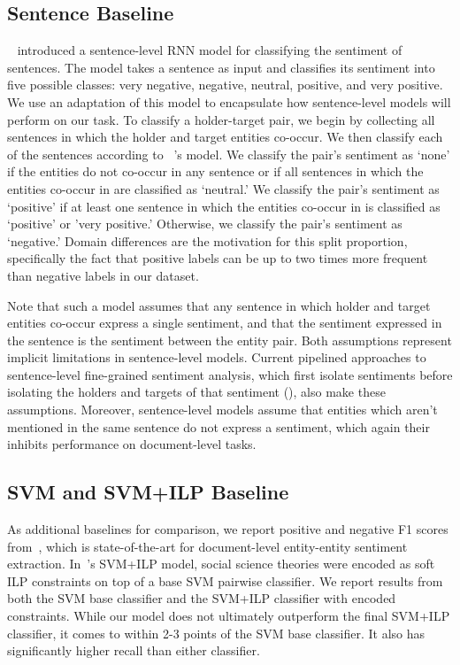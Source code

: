 \documentclass[11pt,a4paper]{article}
\begin{document}
\subsection{Sentence Baseline}
~ introduced a sentence-level RNN model for classifying the sentiment of sentences.
The model takes a sentence as input and classifies its sentiment into five possible classes: very negative, negative, neutral, positive, and very positive.
We use an adaptation of this model to encapsulate how sentence-level models will perform on our task.
To classify a holder-target pair, we begin by collecting all sentences in which the holder and target entities co-occur.
We then classify each of the sentences according to ~'s model.
We classify the pair's sentiment as `none' if the entities do not co-occur in any sentence or if all sentences in which the entities co-occur in are classified as `neutral.'
We classify the pair's sentiment as `positive' if at least one sentence in which the entities co-occur in is classified as `positive' or 'very positive.'
Otherwise, we classify the pair's sentiment as `negative.' %
Domain differences are the motivation for this split proportion, specifically the fact that positive labels can be up to two times more frequent than negative labels in our dataset.
\par Note that such a model assumes that any sentence in which holder and target entities co-occur express a single sentiment, and that the sentiment expressed in the sentence is the sentiment between the entity pair.
Both assumptions represent implicit limitations in sentence-level models.
Current pipelined approaches to sentence-level fine-grained sentiment analysis, which first isolate sentiments before isolating the holders and targets of that sentiment (), also make these assumptions.
Moreover, sentence-level models assume that entities which aren't mentioned in the same sentence do not express a sentiment, which again their inhibits performance on document-level tasks.

\subsection{SVM and SVM+ILP Baseline}
As additional baselines for comparison, we report positive and negative F1 scores from~, which is state-of-the-art for document-level entity-entity sentiment extraction.
In~'s SVM+ILP model, social science theories were encoded as soft ILP constraints on top of a base SVM pairwise classifier.
We report results from both the SVM base classifier and the SVM+ILP classifier with encoded constraints.
While our model does not ultimately outperform the final SVM+ILP classifier, it comes to within 2-3 points of the SVM base classifier.
It also has significantly higher recall than either classifier.
\end{document}
